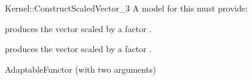 \begin{ccRefFunctionObjectConcept}{Kernel::ConstructScaledVector_3}
A model for this must provide:



            {produces the vector  scaled by a factor .}

            {produces the vector  scaled by a factor .}


\ccRefines
AdaptableFunctor (with two arguments)

\ccSeeAlso
{}\\

\end{ccRefFunctionObjectConcept}
